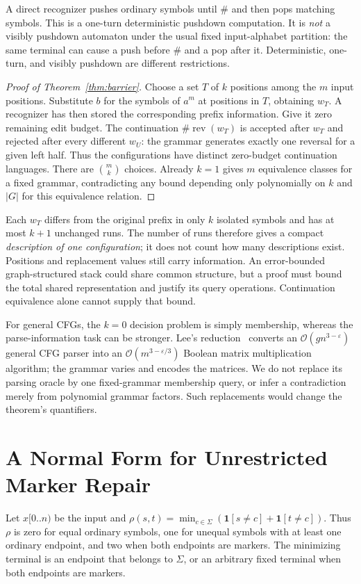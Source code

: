 \documentclass[sigconf,screen]{acmart}
\newcommand{\rev}{\operatorname{rev}}
\newcommand{\eps}{\varepsilon}
\newcommand{\Oh}{\mathcal O}
\newcommand{\ind}[1]{\mathbf 1[#1]}
\theoremstyle{definition}
\begin{document}
A direct recognizer pushes ordinary symbols until $\#$ and then pops matching symbols. This is a one-turn deterministic pushdown computation. It is \emph{not} a visibly pushdown automaton under the usual fixed input-alphabet partition: the same terminal can cause a push before $\#$ and a pop after it. Deterministic, one-turn, and visibly pushdown are different restrictions.

\begin{proof}[Proof of Theorem~\ref{thm:barrier}]
Choose a set $T$ of $k$ positions among the $m$ input positions. Substitute $b$ for the symbols of $a^m$ at positions in $T$, obtaining $w_T$. A recognizer has then stored the corresponding prefix information. Give it zero remaining edit budget. The continuation $\#\rev(w_T)$ is accepted after $w_T$ and rejected after every different $w_U$: the grammar generates exactly one reversal for a given left half. Thus the configurations have distinct zero-budget continuation languages. There are $\binom{m}{k}$ choices. Already $k=1$ gives $m$ equivalence classes for a fixed grammar, contradicting any bound depending only polynomially on $k$ and $|G|$ for this equivalence relation.
\end{proof}

Each $w_T$ differs from the original prefix in only $k$ isolated symbols and has at most $k+1$ unchanged runs. The number of runs therefore gives a compact \emph{description of one configuration}; it does not count how many descriptions exist. Positions and replacement values still carry information. An error-bounded graph-structured stack could share common structure, but a proof must bound the total shared representation and justify its query operations. Continuation equivalence alone cannot supply that bound.

For general CFGs, the $k=0$ decision problem is simply membership, whereas the parse-information task can be stronger. Lee's reduction~\cite{lee2002} converts an $\Oh(g n^{3-\eps})$ general CFG parser into an $\Oh(m^{3-\eps/3})$ Boolean matrix multiplication algorithm; the grammar varies and encodes the matrices. We do not replace its parsing oracle by one fixed-grammar membership query, or infer a contradiction merely from polynomial grammar factors. Such replacements would change the theorem's quantifiers.

\section{A Normal Form for Unrestricted Marker Repair}\label{sec:normal}
Let $x[0..n)$ be the input and $\rho(s,t)=\min_{c\in\Sigma}(\ind{s\ne c}+\ind{t\ne c})$. Thus $\rho$ is zero for equal ordinary symbols, one for unequal symbols with at least one ordinary endpoint, and two when both endpoints are markers. The minimizing terminal is an endpoint that belongs to $\Sigma$, or an arbitrary fixed terminal when both endpoints are markers.
\end{document}
